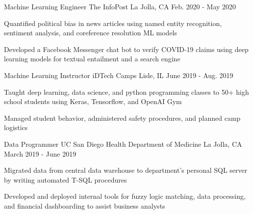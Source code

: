 \begin{cventries}
  \cventry
    {Machine Learning Engineer} %
    {The InfoPost} %
    {La Jolla, CA} %
    {Feb. 2020 - May 2020} %
    {
      \begin{cvitems} %
        \item {Quantified political bias in news articles using named entity recognition, sentiment analysis, and coreference resolution ML models}
        \item {Developed a Facebook Messenger chat bot to verify COVID-19 claims using deep learning models for textual entailment and a search engine}
      \end{cvitems}
    }
    
  \cventry
    {Machine Learning Instructor} %
    {iDTech Camps} %
    {Lisle, IL} %
    {June 2019 - Aug. 2019} %
    {
    \begin{cvitems} %
        \item {Taught deep learning, data science, and python programming classes to 50+ high school students using Keras, Tensorflow, and OpenAI Gym}
        \item {Managed student behavior, administered safety procedures, and planned camp logistics}
    \end{cvitems}
    }

  \cventry
    {Data Programmer} %
    {UC San Diego Health Department of Medicine} %
    {La Jolla, CA} %
    {March 2019 - June 2019} %
    { 
    \begin{cvitems} %
        \item {Migrated data from central data warehouse to department's personal SQL server by writing automated T-SQL procedures}
        \item {Developed and deployed internal tools for fuzzy logic matching, data processing, and financial dashboarding to assist business analysts}
      \end{cvitems}
    }

 
\end{cventries}
